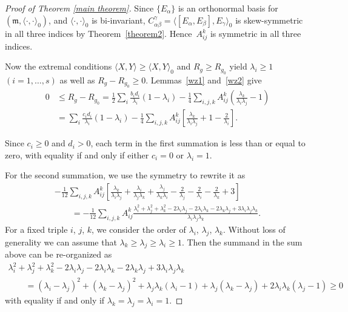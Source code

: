 \documentclass[10pt,a4paper]{amsart}
\begin{document}
\begin{proof}[Proof of Theorem \ref{main theorem}]
Since $\{E_{\alpha}\}$ is an orthonormal basis for $(\mathfrak{m}, \langle \cdot, \cdot \rangle_0)$, and $\langle \cdot, \cdot \rangle_0$ is bi-invariant, $C_{\alpha\beta}^{\gamma}=\langle [E_{\alpha},E_{\beta}], E_{\gamma} \rangle_0$ is skew-symmetric in all three indices by Theorem~\ref{theorem2}. Hence~$A^k_{ij}$ is symmetric in all three indices.

Now the extremal conditions $\langle X,Y\rangle\geq \langle X,Y\rangle_0$
and $R_g\geq R_{g_0}$ yield $\lambda_{i}\geq 1$ $(i=1,\dots,s)$ as well as $R_g- R_{g_0} \geq 0$. %
Lemmas~\ref{wz1} and~\ref{wz2} give
\begin{align*}
	0&\leq R_g- R_{g_0} = \frac{1}{2} \sum_{i} \frac{b_id_i}{\lambda_i} (1-\lambda_i) -\frac{1}{4} \sum_{i, j, k}A^k_{ij} \left(\frac{\lambda_{k}}{\lambda_i\lambda_{j}}-1\right) \\
	&= \sum_{i} \frac{c_id_i}{\lambda_i} (1-\lambda_i) -\frac{1}{4} \sum_{i, j, k}A^k_{ij}\left[ \frac{\lambda_{k}}{\lambda_i\lambda_{j }} +1 - \frac{2}{\lambda_i} \right].
\end{align*}

Since $c_i\geq 0$ and $d_i>0$, each term in the first summation is less than or equal to zero, with equality if and only if either $c_i=0$ or $\lambda_i=1$.

For the second summation, we use the symmetry to rewrite it as
\begin{gather*}
-\frac{1}{12} \sum_{i, j, k} A^k_{ij}\left[ \frac{\lambda_{k}}{\lambda_i\lambda_{j }} +\frac{\lambda_{i}}{\lambda_j\lambda_{k}} +\frac{\lambda_{j}}{\lambda_k\lambda_{i}} - \frac{2}{\lambda_j} - \frac{2}{\lambda_i} - \frac{2}{\lambda_k}+3 \right] \\
\qquad{} =-\frac{1}{12} \sum_{i, j, k} A^k_{ij} \frac{\lambda_i^2+\lambda_j^2+\lambda_k^2-2\lambda_i\lambda_j-2\lambda_i\lambda_k-2\lambda_k\lambda_j+3\lambda_i \lambda_j\lambda_k}{\lambda_i\lambda_j\lambda_k} .
\end{gather*}
For a fixed triple $i$, $j$, $k$, we consider the order of $\lambda_{i}$, $\lambda_{j}$, $\lambda_{k}$. Without loss of generality we can assume that $\lambda_{k}\geq \lambda_{j}\geq \lambda_{i}\geq 1$. Then the summand in the sum above can be re-organized as
\begin{gather*}
 \lambda_i^2+\lambda_j^2+\lambda_k^2-2\lambda_i\lambda_j-2\lambda_i\lambda_k-2\lambda_k\lambda_j+3\lambda_i \lambda_j\lambda_k \\
\qquad{} =  (\lambda_i-\lambda_j)^2+(\lambda_k-\lambda_j)^2+\lambda_j\lambda_k(\lambda_i-1)+\lambda_j (\lambda_k-\lambda_j)+2\lambda_i\lambda_k(\lambda_j-1)
 \geq 0
\end{gather*}
with equality if and only if $\lambda_{k}= \lambda_{j}= \lambda_{i}=1$.


\end{proof}
\end{document}
